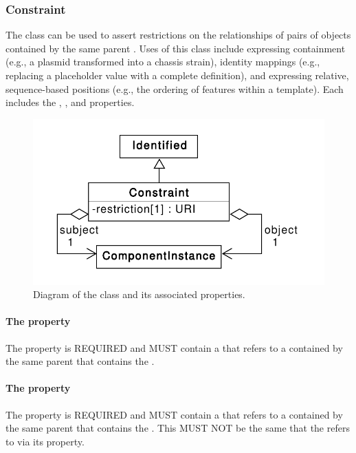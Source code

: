 \subsubsection{Constraint}
\label{sec:Constraint}
The  class can be used to assert restrictions on the relationships of pairs of  objects contained by the same parent .
Uses of this class include expressing containment (e.g., a plasmid transformed into a chassis strain), identity mappings (e.g., replacing a placeholder value with a complete definition), and expressing relative, sequence-based positions (e.g., the ordering of features within a template).
Each  includes the , , and  properties.

\begin{figure}[ht]
\begin{center}
\includegraphics[scale=0.6]{uml/constraint}
\caption[]{Diagram of the  class and its associated properties.}
\label{uml:sequence_constraint}
\end{center}
\end{figure}

\paragraph{The  property}\label{sec:subject}
The  property is REQUIRED and MUST contain a  that refers to a  contained by the same parent  that contains the .

\paragraph{The  property}\label{sec:object}
The  property is REQUIRED and MUST contain a  that refers to a  contained by the same parent  that contains the . This  MUST NOT be the same  that the  refers to via its  property.

